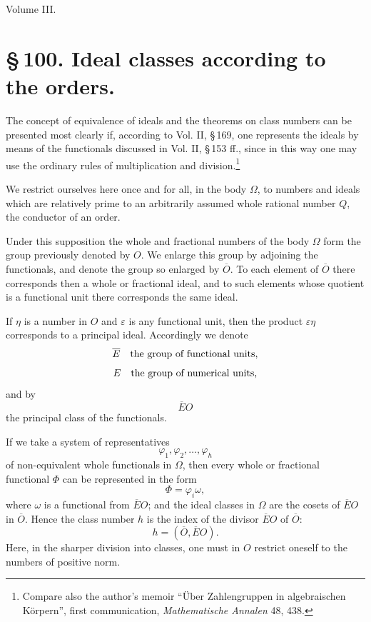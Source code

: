 \documentclass[11pt]{article}
\begin{document}
\begin{center}{\large Volume III.}\end{center}

\section*{\S\,100. Ideal classes according to the orders.}

The concept of equivalence of ideals and the theorems on class numbers can be presented most clearly if, according to Vol. II, \S\,169, one represents the ideals by means of the functionals discussed in Vol. II, \S\,153 ff., since in this way one may use the ordinary rules of multiplication and division.\footnote{Compare also the author's memoir ``Über Zahlengruppen in algebraischen Körpern'', first communication, \emph{Mathematische Annalen} 48, 438.}

We restrict ourselves here once and for all, in the body \(\Omega\), to numbers and ideals which are relatively prime to an arbitrarily assumed whole rational number \(Q\), the conductor of an order.

Under this supposition the whole and fractional numbers of the body \(\Omega\) form the group previously denoted by \(O\). We enlarge this group by adjoining the functionals, and denote the group so enlarged by \(\overline O\). To each element of \(\overline O\) there corresponds then a whole or fractional ideal, and to such elements whose quotient is a functional unit there corresponds the same ideal.

If \(\eta\) is a number in \(O\) and \(\varepsilon\) is any functional unit, then the product \(\varepsilon\eta\) corresponds to a principal ideal. Accordingly we denote
\[
 \overline E\quad\hbox{the group of functional units,}
\]
\[
 E\quad\hbox{the group of numerical units,}
\]
and by
\[
 \overline EO
\]
the principal class of the functionals.

If we take a system of representatives
\begin{equation}
 \varphi_1,\varphi_2,\ldots,\varphi_h
\tag{1}
\end{equation}
of non-equivalent whole functionals in \(\Omega\), then every whole or fractional functional \(\Phi\) can be represented in the form
\[
 \Phi=\varphi_i\omega,
\]
where \(\omega\) is a functional from \(\overline EO\); and the ideal classes in \(\Omega\) are the cosets of \(\overline EO\) in \(\overline O\). Hence the class number \(h\) is the index of the divisor \(\overline EO\) of \(\overline O\):
\begin{equation}
 h=(\overline O,\overline EO).
\tag{2}
\end{equation}
Here, in the sharper division into classes, one must in \(O\) restrict oneself to the numbers of positive norm.
\end{document}
